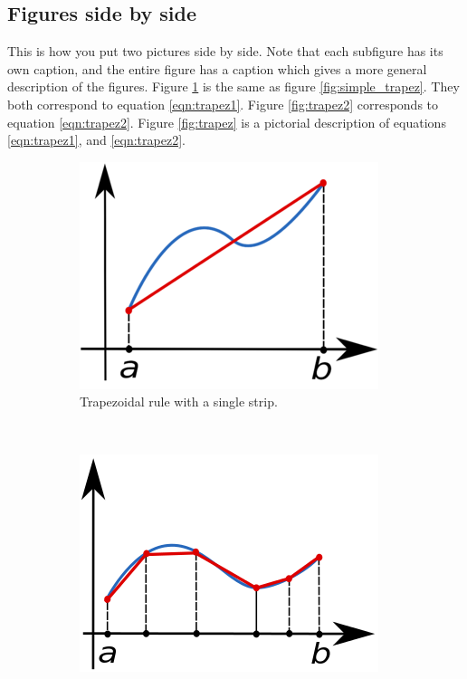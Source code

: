 \documentclass[12pt,a4paper]{article}
\begin{document}
\subsection{Figures side by side}\label{subfigures}
This is how you put two pictures side by side. Note that each subfigure has its own caption, and the entire figure has a caption which gives a more general description of the figures. Figure \ref{fig:trapez1} is the same as figure \ref{fig:simple_trapez}. They both correspond to equation \eqref{eqn:trapez1}. Figure \ref{fig:trapez2} corresponds to equation \eqref{eqn:trapez2}. Figure \ref{fig:trapez} is a pictorial description of equations \eqref{eqn:trapez1}, and \eqref{eqn:trapez2}.
\begin{figure}
    \centering
    \begin{subfigure}[b]{0.4\textwidth}
        \includegraphics[width=\textwidth]{trapez1.png}
        \caption{Trapezoidal rule with a single strip.}
        \label{fig:trapez1}
    \end{subfigure}
    ~ %
    \begin{subfigure}[b]{0.4\textwidth}
        \includegraphics[width=\textwidth]{trapez2.png}

\end{subfigure}
\end{figure}
\end{document}
